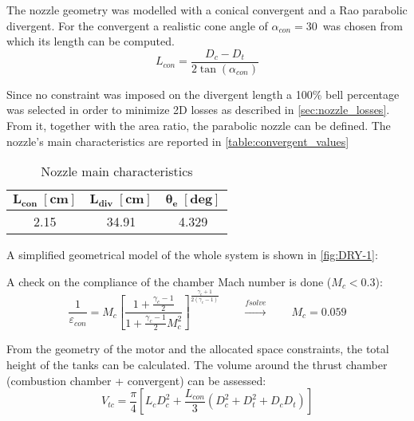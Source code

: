 The nozzle geometry was modelled with a conical convergent and a Rao parabolic divergent\cite{rao_article}. For the convergent a realistic cone angle of $\alpha_{con} = 30$\textdegree $\,$ was chosen from which its length can be computed.
\begin{equation}
    L_{con} = \frac{D_c - D_t}{2 \tan(\alpha_{con})}
\end{equation} 

Since no constraint was imposed on the divergent length a 100\% bell percentage was selected in order to minimize 2D losses as described in \autoref{sec:nozzle_losses}. From it, together with the area ratio, the parabolic nozzle can be defined. The nozzle's main characteristics are reported in \autoref{table:convergent_values}
\begin{table}[H]
    \renewcommand{\arraystretch}{1.2}
    \centering
    \begin{tabular}{|c|c|c|}
        \hline
        $\boldsymbol{L_{con} \; [\textbf{cm}]}$ & $\boldsymbol{L_{div} \; [\textbf{cm}]}$ & $\boldsymbol{\theta_e \; [\textbf{deg}]}$ \\
        \hline
        \hline
        2.15 & 34.91 & 4.329 \\
        \hline
    \end{tabular}
    \caption{Nozzle main characteristics}
    \label{table:convergent_values}
\end{table}

A simplified geometrical model of the whole system is shown in \autoref{fig:DRY-1}:



A check on the compliance of the chamber Mach number is done ($M_c < 0.3$):
\begin{equation}    
    \frac{1}{\varepsilon_{con}} = M_c \left[ \frac{1 + \frac{\gamma_c - 1}{2}}{1 + \frac{\gamma_c - 1}{2} M_c^2} \right]^{\frac{\gamma_c + 1}{2(\gamma_c - 1)}}
    \qquad \xrightarrow{\textit{fsolve}} \qquad M_c = 0.059
\end{equation}

From the geometry of the motor and the allocated space constraints, the total height of the tanks can be calculated. The volume around the thrust chamber (combustion chamber + convergent) can be assessed:
\begin{equation}
    V_{tc} = \frac{\pi}{4} \left[L_c D_c^2  + \frac{L_{con}}{3} \left(D_c^2 + D_t^2 + D_c D_t\right)\right]
    \label{eq:v_tc}
\end{equation}

